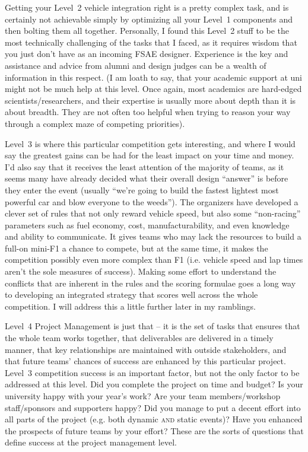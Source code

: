 \documentclass[10pt, a4paper, article, oneside, twocolumn, final]{memoir}
\begin{document}
Getting your Level~2 vehicle integration right is a pretty complex task, and is certainly not achievable simply by optimizing all your Level~1 components and then bolting them all together. Personally, I found this Level~2 stuff to be the most technically challenging of the tasks that I faced, as it requires wisdom that you just don’t have as an incoming FSAE designer. Experience is the key and assistance and advice from alumni and design judges can be a wealth of information in this respect. (I am loath to say, that your academic support at uni might not be much help at this level. Once again, most academics are hard-edged scientists/\allowbreak researchers, and their expertise is usually more about depth than it is about breadth. They are not often too helpful when trying to reason your way through a complex maze of competing priorities). 

Level~3 is where this particular competition gets interesting, and where I would say the greatest gains can be had for the least impact on your time and money. I’d also say that it receives the least attention of the majority of teams, as it seems many have already decided what their overall design “answer” is before they enter the event (usually “we’re going to build the fastest lightest most powerful car and blow everyone to the weeds”). The organizers have developed a clever set of rules that not only reward vehicle speed, but also some “non-racing” parameters such as fuel economy, cost, manufacturability, and even knowledge and ability to communicate. It gives teams who may lack the resources to build a full-on mini-F1 a chance to compete, but at the same time, it makes the competition possibly even more complex than F1 (i.e. vehicle speed and lap times aren’t the sole measures of success). Making some effort to understand the conflicts that are inherent in the rules and the scoring formulae goes a long way to developing an integrated strategy that scores well across the whole competition. I will address this a little further later in my ramblings. 

Level~4 Project Management is just that -- it is the set of tasks that ensures that the whole team works together, that deliverables are delivered in a timely manner, that key relationships are maintained with outside stakeholders, and that future teams’ chances of success are enhanced by this particular project. Level~3 competition success is an important factor, but not the only factor to be addressed at this level. Did you complete the project on time and budget? Is your university happy with your year’s work? Are your team members/\allowbreak workshop staff/\allowbreak sponsors and supporters happy? Did you manage to put a decent effort into all parts of the project (e.g. both dynamic \textsc{and} static events)? Have you enhanced the prospects of future teams by your effort? These are the sorts of questions that define success at the project management level. 
\end{document}
